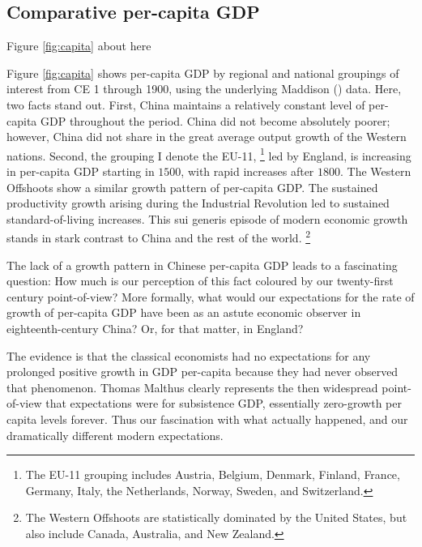 \documentclass[12pt]{article}
\numberwithin{equation}{section}
\begin{document}
		\subsection*{Comparative per-capita GDP}			

\begin{center}		
Figure \ref{fig:capita} about here		
\end{center}

		Figure \ref{fig:capita} shows per-capita GDP by regional and national groupings of interest from CE 1 through 1900, using the underlying Maddison (\citeyear{maddison_maddison_2010}) data. Here, two facts stand out. First, China maintains a relatively constant level of per-capita GDP throughout the period. China did not become absolutely poorer; however, China did not share in the great average output growth of the Western nations. Second, the grouping I denote the EU-11, \footnote{The EU-11 grouping includes Austria, Belgium, Denmark, Finland, France, Germany, Italy, the Netherlands, Norway, Sweden, and Switzerland.} led by England, is increasing in per-capita GDP starting in $1500$, with rapid increases after $1800$. The Western Offshoots show a similar growth pattern of per-capita GDP. The sustained productivity growth arising during the Industrial Revolution led to sustained standard-of-living increases. This sui generis episode of modern economic growth stands in stark contrast to China and the rest of the world. \footnote{The Western Offshoots are statistically dominated by the United States, but also include Canada, Australia, and New Zealand.}
		
		The lack of a growth pattern in Chinese per-capita GDP leads to a fascinating question: How much is our perception of this fact coloured by our twenty-first century point-of-view? More formally, what would our expectations for the rate of growth of per-capita GDP have been as an astute economic observer in eighteenth-century China? Or, for that matter, in England?
		
		The evidence is that the classical economists had no expectations for any prolonged positive growth in GDP per-capita because they had never observed that phenomenon. Thomas Malthus clearly represents the then widespread point-of-view that expectations were for subsistence GDP, essentially zero-growth per capita levels forever. Thus our fascination with what actually happened, and our dramatically different modern expectations.
		
\end{document}
